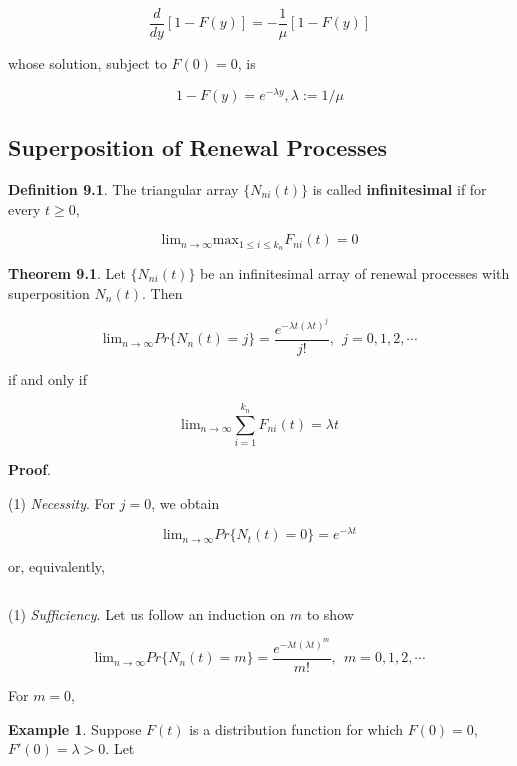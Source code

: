 \documentclass[12pt]{article}
\theoremstyle{nonumberbreak}
\begin{document}
$$
\frac{d}{dy} [1 - F(y)] = - \frac{1}{\mu} [1-F(y)]
$$

whose solution, subject to $F(0) = 0$, is

$$
1 - F(y) = e^{-\lambda y}, \lambda := 1/\mu
$$







\subsection{Superposition of Renewal Processes}

\begin{theorem}
\textbf{Definition 9.1}. The triangular array $\{ N_{ni}(t) \}$ is called \textbf{infinitesimal} if for every $t \ge 0$,

$$
\mathrm{lim}_{n \to \infty} \mathrm{max}_{1 \le i \le k_n} F_{ni} (t) = 0
$$
\end{theorem}



\begin{theorem}
\textbf{Theorem 9.1}. Let $\{ N_{ni}(t) \}$ be an infinitesimal array of renewal processes with superposition $N_n(t)$. Then

$$
\mathrm{lim}_{n\to\infty} Pr \{ N_n(t) = j \} = \frac{e^{-\lambda t (\lambda t)^j}}{j!}, \ \ j=0,1,2,\cdots
$$

if and only if

$$
\mathrm{lim}_{n\to\infty} \sum_{i=1}^{k_n} F_{ni}(t) = \lambda t
$$

\end{theorem}

\textbf{Proof}. 

(1) \textit{Necessity}. For $j=0$, we obtain 

$$
\mathrm{lim}_{n\to \infty} Pr \{ N_t(t) = 0 \} = e^{-\lambda t}
$$

or, equivalently,

$$
\
$$


(1) \textit{Sufficiency}. Let us follow an induction on $m$ to show

$$
\mathrm{lim}_{n\to\infty} Pr \{ N_n(t) = m \} = \frac{e^{-\lambda t (\lambda t)^m}}{m!}, \ \ m=0,1,2,\cdots
$$

For $m=0$, 





\textbf{Example 1}. Suppose $F(t)$ is a distribution function for which $F(0) = 0$, $F'(0) = \lambda >0$. Let
\end{document}
